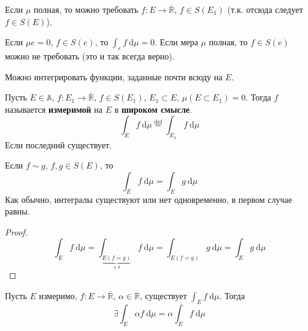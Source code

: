 \documentclass{article}
\begin{document}
    \begin{remark}
        Если $\mu$ полная, то можно требовать $f\colon E\to\overline{\mathbb R}$, $f\in S(E_1)$ (т.к. отсюда следует $f\in S(E)$).
    \end{remark}
    \begin{corollary}
        Если $\mu e=0$, $f\in S(e)$, то $\int_ef~\mathrm d\mu=0$. Если мера $\mu$ полная, то $f\in S(e)$ можно не требовать (это и так всегда верно).
    \end{corollary}
    \begin{remark}
        Можно интегрировать функции, заданные почти всюду на $E$.
    \end{remark}
    \begin{definition}
        Пусть $E\in\mathbb A$, $f\colon E_1\to\overline{\mathbb R}$, $f\in S(E_1)$, $E_1\subset E$, $\mu(E\subset E_1)=0$. Тогда $f$ называется \textbf{измеримой} на $E$ в \textbf{широком смысле}.\\
        $$
        \int_Ef~\mathrm d\mu\overset{\mathrm{def}}=\int_{E_1}f~\mathrm d\mu
        $$
        Если последний существует.
    \end{definition}
    \begin{corollary}
        Если $f\sim g$, $f,g\in S(E)$, то
        $$
        \int_Ef~\mathrm d\mu=\int_Eg~\mathrm d\mu
        $$
        Как обычно, интегралы существуют или нет одновременно, в первом случае равны.
    \end{corollary}
    \begin{proof}
        $$
        \int_Ef~\mathrm d\mu=\int_{\underbrace{E(f=g)}_{\in\mathbb A}}f~\mathrm d\mu=\int_{E(f=g)}g~\mathrm d\mu=\int_Eg~\mathrm d\mu
        $$
    \end{proof}
    \begin{theorem}
        Пусть $E$ измеримо, $f\colon E\to\overline{\mathbb R}$, $\alpha\in\mathbb R$, существует $\int_E f~\mathrm d\mu$. Тогда
        $$
        \exists \int_E \alpha f~\mathrm d\mu=\alpha\int_E f~\mathrm d\mu
        $$
    \end{theorem}
\end{document}
